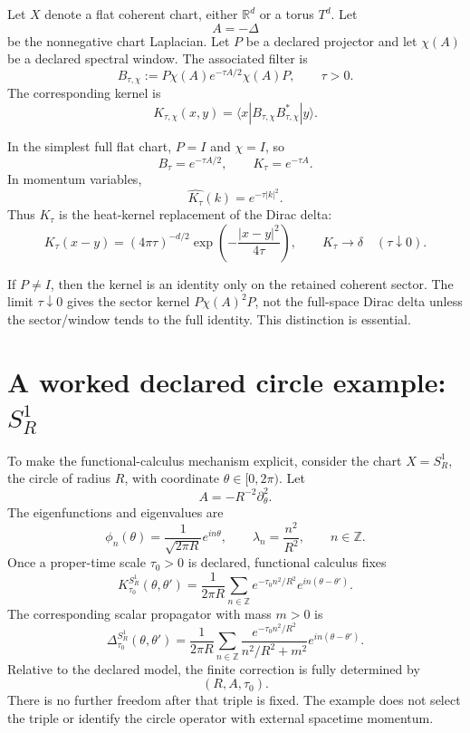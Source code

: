 \documentclass[11pt]{article}
\begin{document}
Let \(X\) denote a flat coherent chart, either \(\mathbb R^d\) or a torus \(T^d\). Let
\[
        A=-\Delta
\]
be the nonnegative chart Laplacian.  Let \(P\) be a declared projector and let \(\chi(A)\) be a
declared spectral window.  The associated filter is
\[
        B_{\tau,\chi}
        :=
        P\chi(A)e^{-\tau A/2}\chi(A)P ,
        \qquad \tau>0.
\]
The corresponding kernel is
\[
        K_{\tau,\chi}(x,y)
        =
        \langle x|B_{\tau,\chi}B_{\tau,\chi}^{\ast}|y\rangle .
\]

In the simplest full flat chart, \(P=I\) and \(\chi=I\), so
\[
        B_\tau=e^{-\tau A/2},
        \qquad
        K_\tau=e^{-\tau A}.
\]
In momentum variables,
\[
        \widehat{K_\tau}(k)=e^{-\tau |k|^2}.
\]
Thus \(K_\tau\) is the heat-kernel replacement of the Dirac delta:
\[
        K_\tau(x-y)
        =
        (4\pi\tau)^{-d/2}\exp\!\left(-\frac{|x-y|^2}{4\tau}\right),
        \qquad
        K_\tau\to\delta
        \quad(\tau\downarrow0).
\]

\begin{remark}
If \(P\neq I\), then the kernel is an identity only on the retained coherent sector. The limit \(\tau\downarrow0\) gives the sector kernel \(P\chi(A)^2P\), not the full-space Dirac delta unless the sector/window tends to the full identity. This distinction is essential.
\end{remark}


\section{A worked declared circle example:
\texorpdfstring{\(S^1_R\)}{S1-R}}

To make the functional-calculus mechanism explicit, consider the chart \(X=S^1_R\), the
circle of radius \(R\), with coordinate \(\theta\in[0,2\pi)\). Let
\[
        A=-R^{-2}\partial_\theta^2 .
\]
The eigenfunctions and eigenvalues are
\[
        \phi_n(\theta)=\frac{1}{\sqrt{2\pi R}}e^{in\theta},
        \qquad
        \lambda_n=\frac{n^2}{R^2},
        \qquad n\in\mathbb Z .
\]
Once a proper-time scale \(\tau_0>0\) is declared, functional calculus fixes
\[
        K_{\tau_0}^{S^1_R}(\theta,\theta')
        =
        \frac{1}{2\pi R}
        \sum_{n\in\mathbb Z}
        e^{-\tau_0 n^2/R^2}
        e^{in(\theta-\theta')}.
\]
The corresponding scalar propagator with mass \(m>0\) is
\[
        \Delta_{\tau_0}^{S^1_R}(\theta,\theta')
        =
        \frac{1}{2\pi R}
        \sum_{n\in\mathbb Z}
        \frac{e^{-\tau_0 n^2/R^2}}{n^2/R^2+m^2}
        e^{in(\theta-\theta')}.
\]
Relative to the declared model, the finite correction is fully determined by
\[
        (R,A,\tau_0).
\]
There is no further freedom after that triple is fixed.  The example does not select the
triple or identify the circle operator with external spacetime momentum.
\end{document}
